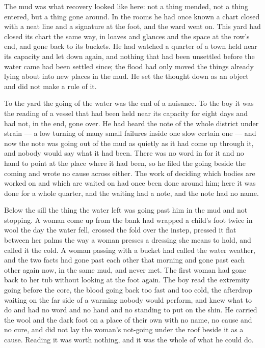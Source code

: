 The mud was what recovery looked like here: not a thing mended, not a thing entered, but a thing gone around. In the rooms he had once known a chart closed with a neat line and a signature at the foot, and the ward went on. This yard had closed its chart the same way, in loaves and glances and the space at the row's end, and gone back to its buckets. He had watched a quarter of a town held near its capacity and let down again, and nothing that had been unsettled before the water came had been settled since; the flood had only moved the things already lying about into new places in the mud. He set the thought down as an object and did not make a rule of it.

To the yard the going of the water was the end of a nuisance. To the boy it was the reading of a vessel that had been held near its capacity for eight days and had not, in the end, gone over. He had heard the note of the whole district under strain --- a low turning of many small failures inside one slow certain one --- and now the note was going out of the mud as quietly as it had come up through it, and nobody would say what it had been. There was no word in  for it and no hand to point at the place where it had been, so he filed the going beside the coming and wrote no cause across either. The work of deciding which bodies are worked on and which are waited on had once been done around him; here it was done for a whole quarter, and the waiting had a note, and the note had no name.

Below the sill the thing the water left was going past him in the mud and not stopping. A woman come up from the bank had wrapped a child's foot twice in wool the day the water fell, crossed the fold over the instep, pressed it flat between her palms the way a woman presses a dressing she means to hold, and called it the cold. A woman passing with a bucket had called the water weather, and the two facts had gone past each other that morning and gone past each other again now, in the same mud, and never met. The first woman had gone back to her tub without looking at the foot again. The boy read the extremity going before the core, the blood going back too fast and too cold, the afterdrop waiting on the far side of a warming nobody would perform, and knew what to do and had no word and no hand and no standing to put on the shin. He carried the wool and the dark foot on a place of their own with no name, no cause and no cure, and did not lay the woman's not-going under the roof beside it as a cause. Reading it was worth nothing, and it was the whole of what he could do.

